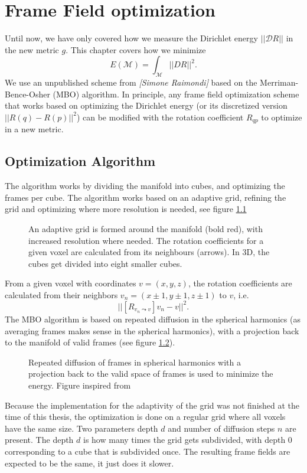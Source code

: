 \documentclass[../thesis.tex]{subfiles}
\begin{document}
\chapter{Frame Field optimization}
\label{ch:optimization}
Until now, we have only covered how we measure the Dirichlet energy $||\mathcal{D}R||$ in
the new metric $g$.
This chapter covers how we minimize
$$E(\mathcal{M})=\int_{\mathcal{M}}||DR||^2.$$
We use an unpublished scheme from \emph{[Simone Raimondi]} based
on the Merriman-Bence-Osher (MBO) algorithm.
In principle, any frame field optimization scheme that works based on
optimizing the Dirichlet energy (or its discretized version $||R(q)-R(p)||^2$) can be
modified with the rotation coefficient $R_{qp}$ to optimize in a new metric.
\section{Optimization Algorithm}
The algorithm works by dividing the manifold into cubes,
and optimizing the frames per cube. The algorithm works based on an adaptive
grid, refining the grid and optimizing where more resolution is needed, see figure \ref{fig:grid} 
\begin{figure}[htb]
    \centering
    \def\svgwidth{20em}
    
    \caption{An adaptive grid is formed around the manifold (bold red), with increased resolution where needed.
    The rotation coefficients for a given voxel are calculated from its neighbours (arrows).
    In 3D, the cubes get divided into eight smaller cubes.}
    \label{fig:grid}
\end{figure}
From a given voxel with coordinates $v=(x,y,z)$, the rotation coefficients
are calculated from their neighbors $v_n=(x\pm 1,y\pm 1,z\pm 1)$ to $v$,
i.e. $$||[R_{v_n\leadsto v}]v_n - v||^2.$$
The MBO algorithm is based on repeated diffusion in the spherical harmonics (as averaging frames
makes sense in the spherical harmonics), with a projection back to the manifold
of valid frames (see figure \ref{fig:diffusionprojection}).
\begin{figure}[htb]
    \centering
    \def\svgwidth{20em}
    
    \caption{Repeated diffusion of frames in spherical harmonics with a projection back to the
    valid space of frames is used to minimize the energy. Figure inspired from \cite{Palmer} }
    \label{fig:diffusionprojection}
\end{figure}


Because the implementation for the adaptivity of the grid was not finished
at the time of this thesis, the optimization is done on a regular grid where
all voxels have the same size. Two parameters depth $d$ and number of diffusion steps $n$
are present. The depth $d$ is how many times the grid gets subdivided, with depth $0$
corresponding to a cube that is subdivided once.
The resulting frame fields are expected to be the same, it just does it slower.
\end{document}
